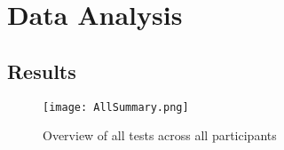\chapter{Data Analysis} \label{DataAnalysis}

\section{Results}

\begin{figure}[H]
    \centering
    \texttt{[image: AllSummary.png]}
    \caption{Overview of all tests across all participants}
    \label{fig:AllSummary}
\end{figure}


